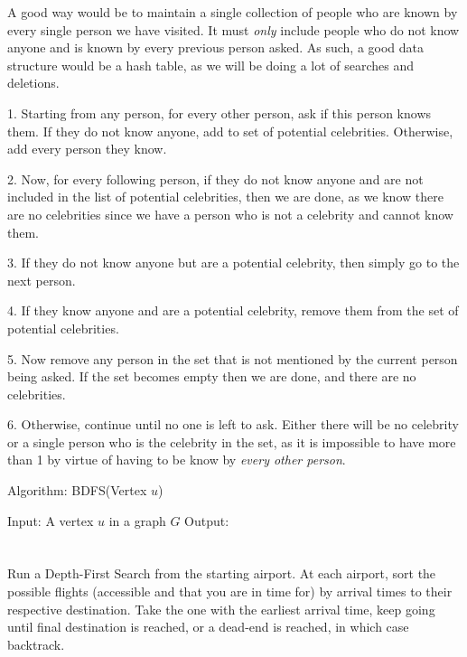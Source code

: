 \documentclass[11pt,letterpaper]{article}
\begin{document}
		A good way would be to maintain a single collection of people who are known by every single person we have visited. It must \textit{only} include people who do not know anyone and is known by every previous person asked.
		As such, a good data structure would be a hash table, as we will be doing a lot of searches and deletions.
		
		1. Starting from any person, for every other person, ask if this person knows them. If they do not know anyone, add to set of potential celebrities. Otherwise, add every person they know.
		
		2. Now, for every following person, if they do not know anyone and are not included in the list of potential celebrities, then we are done, as we know there are no celebrities since we have a person who is not a celebrity and cannot know them.
		
		3. If they do not know anyone but are a potential celebrity, then simply go to the next person.
		
		4. If they know anyone and are a potential celebrity, remove them from the set of potential celebrities.
		
		5. Now remove any person in the set that is not mentioned by the current person being asked. If the set becomes empty then we are done, and there are no celebrities.
		
		6. Otherwise, continue until no one is left to ask. Either there will be no celebrity or a single person who is the celebrity in the set, as it is impossible to have more than 1 by virtue of having to be know by \textit{every other person}.
		\begin{center}
			Algorithm: BDFS(Vertex $u$)
		\end{center}
		\begin{algorithm}[caption={}, label={alg1}]
			Input: A vertex $u$ in a graph $G$
			Output: 
			
			
		\end{algorithm}
	
	\section{}
		Run a Depth-First Search from the starting airport. At each airport, sort the possible flights (accessible and that you are in time for) by arrival times to their respective destination. Take the one with the earliest arrival time, keep going until final destination is reached, or a dead-end is reached, in which case backtrack.
		
\end{document}
